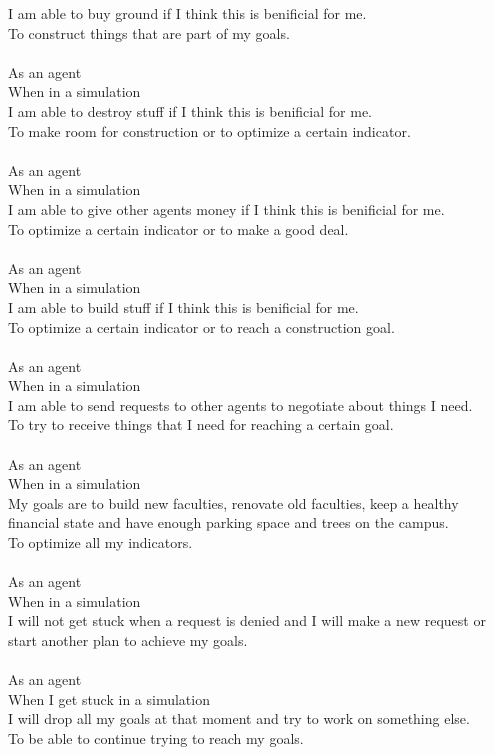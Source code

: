 I am able to buy ground if I think this is benificial for me.\\
To construct things that are part of my goals.\\
\\
As an agent\\
When in a simulation\\
I am able to destroy stuff if I think this is benificial for me.\\
To make room for construction or to optimize a certain indicator.\\
\\
As an agent\\
When in a simulation\\
I am able to give other agents money if I think this is benificial for me.\\
To optimize a certain indicator or to make a good deal.\\
\\
As an agent\\
When in a simulation\\
I am able to build stuff if I think this is benificial for me.\\
To optimize a certain indicator or to reach a construction goal.\\
\\
As an agent\\
When in a simulation\\
I am able to send requests to other agents to negotiate about things I need.\\
To try to receive things that I need for reaching a certain goal.\\
\\
As an agent\\
When in a simulation\\
My goals are to build new faculties, renovate old faculties, keep a healthy financial state and have enough parking space and trees on the campus.\\
To optimize all my indicators.\\
\\
As an agent\\
When in a simulation\\
I will not get stuck when a request is denied and I will make a new request or start another plan to achieve my goals.\\
\\
As an agent\\
When I get stuck in a simulation\\
I will drop all my goals at that moment and try to work on something else.\\
To be able to continue trying to reach my goals.


